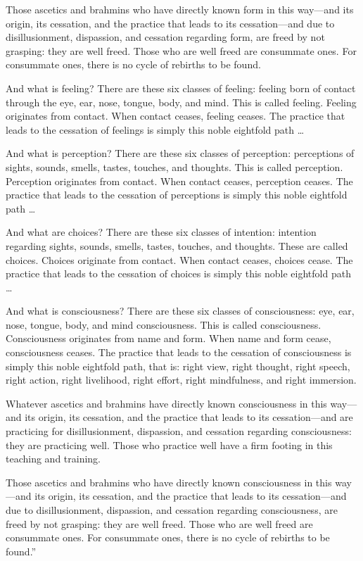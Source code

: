 \documentclass[12pt,openany]{book}%
\begin{document}
Those ascetics and brahmins who have directly known form in this way—and its origin, its cessation, and the practice that leads to its cessation—and due to disillusionment, dispassion, and cessation regarding form, are freed by not grasping: they are well freed. Those who are well freed are consummate ones. For consummate ones, there is no cycle of rebirths to be found. 

And what is feeling? There are these six classes of feeling: feeling born of contact through the eye, ear, nose, tongue, body, and mind. This is called feeling. Feeling originates from contact. When contact ceases, feeling ceases. The practice that leads to the cessation of feelings is simply this noble eightfold path … 

And what is perception? There are these six classes of perception: perceptions of sights, sounds, smells, tastes, touches, and thoughts. This is called perception. Perception originates from contact. When contact ceases, perception ceases. The practice that leads to the cessation of perceptions is simply this noble eightfold path … 

And what are choices? There are these six classes of intention: intention regarding sights, sounds, smells, tastes, touches, and thoughts. These are called choices. Choices originate from contact. When contact ceases, choices cease. The practice that leads to the cessation of choices is simply this noble eightfold path … 

And what is consciousness? There are these six classes of consciousness: eye, ear, nose, tongue, body, and mind consciousness. This is called consciousness. Consciousness originates from name and form. When name and form cease, consciousness ceases. The practice that leads to the cessation of consciousness is simply this noble eightfold path, that is: right view, right thought, right speech, right action, right livelihood, right effort, right mindfulness, and right immersion. 

Whatever ascetics and brahmins have directly known consciousness in this way—and its origin, its cessation, and the practice that leads to its cessation—and are practicing for disillusionment, dispassion, and cessation regarding consciousness: they are practicing well. Those who practice well have a firm footing in this teaching and training. 

Those ascetics and brahmins who have directly known consciousness in this way—and its origin, its cessation, and the practice that leads to its cessation—and due to disillusionment, dispassion, and cessation regarding consciousness, are freed by not grasping: they are well freed. Those who are well freed are consummate ones. For consummate ones, there is no cycle of rebirths to be found.” 
\end{document}
